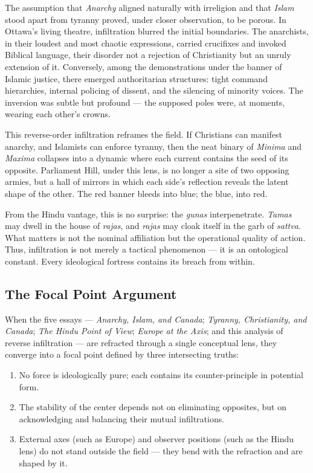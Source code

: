 \documentclass[12pt]{article}
\begin{document}
The assumption that \textit{Anarchy} aligned naturally with irreligion and that \textit{Islam} stood apart from tyranny proved, under closer observation, to be porous. In Ottawa’s living theatre, infiltration blurred the initial boundaries. The anarchists, in their loudest and most chaotic expressions, carried crucifixes and invoked Biblical language, their disorder not a rejection of Christianity but an unruly extension of it. Conversely, among the demonstrations under the banner of Islamic justice, there emerged authoritarian structures: tight command hierarchies, internal policing of dissent, and the silencing of minority voices. The inversion was subtle but profound — the supposed poles were, at moments, wearing each other’s crowns.

This reverse-order infiltration reframes the field. If Christians can manifest anarchy, and Islamists can enforce tyranny, then the neat binary of \textit{Minima} and \textit{Maxima} collapses into a dynamic where each current contains the seed of its opposite. Parliament Hill, under this lens, is no longer a site of two opposing armies, but a hall of mirrors in which each side’s reflection reveals the latent shape of the other. The red banner bleeds into blue; the blue, into red.

From the Hindu vantage, this is no surprise: the \textit{gunas} interpenetrate. \textit{Tamas} may dwell in the house of \textit{rajas}, and \textit{rajas} may cloak itself in the garb of \textit{sattva}. What matters is not the nominal affiliation but the operational quality of action. Thus, infiltration is not merely a tactical phenomenon — it is an ontological constant. Every ideological fortress contains its breach from within.

\subsection*{The Focal Point Argument}
When the five essays — \textit{Anarchy, Islam, and Canada}; \textit{Tyranny, Christianity, and Canada}; \textit{The Hindu Point of View}; \textit{Europe at the Axis}; and this analysis of reverse infiltration — are refracted through a single conceptual lens, they converge into a focal point defined by three intersecting truths:

\begin{enumerate}
    \item No force is ideologically pure; each contains its counter-principle in potential form.
    \item The stability of the center depends not on eliminating opposites, but on acknowledging and balancing their mutual infiltrations.
    \item External axes (such as Europe) and observer positions (such as the Hindu lens) do not stand outside the field — they bend with the refraction and are shaped by it.
\end{enumerate}
\end{document}
